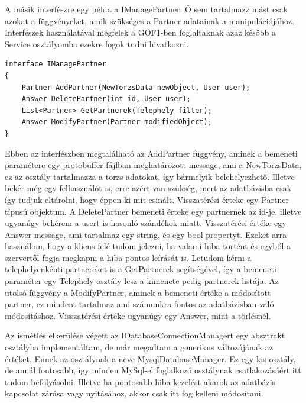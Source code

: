\documentclass[
]{thesis-ekf}
\theoremstyle{definition}
\theoremstyle{remark}
\begin{document}
A másik interfészre egy példa a IManagePartner. Ő sem tartalmazz mást csak azokat a függvényeket, amik szükséges a Partner adatainak a manipulációjához. Interfészek használatával megfelek a GOF1-ben foglaltaknak azaz később a Service osztályomba ezekre fogok tudni hivatkozni.\\
\begin{lstlisting}[caption={Kötelező interfész partnereket kezelő osztályok.},captionpos=b]
interface IManagePartner
{
	Partner AddPartner(NewTorzsData newObject, User user);
	Answer DeletePartner(int id, User user);
	List<Partner> GetPartnerek(Telephely filter);
	Answer ModifyPartner(Partner modifiedObject);
}
\end{lstlisting}
Ebben az interfészben megtalálható az AddPartner függvény, aminek a bemeneti paramétere egy protobuffer fájlban meghatározott message, ami a NewTorzsData, ez az osztály tartalmazza a törzs adatokat, így bármelyik belehelyezhető. Illetve bekér még egy felhasználót is, erre azért van szükség, mert az adatbázisba csak így tudjuk eltárolni, hogy éppen ki mit csinált. Visszatérési érteke egy Partner típusú objektum. A DeletePartner bemeneti érteke egy partnernek az id-je, illetve ugyanúgy bekérem a usert is hasonló szándékok miatt. Visszatérési értéke egy Answer message, ami tartalmaz egy string, és egy bool propertyt. Ezeket arra használom, hogy a kliens felé tudom jelezni, ha valami hiba történt és egyből a szervertől fogja megkapni a hiba pontos leírását is. \cite{errorhandling}Letudom kérni a telephelyenkénti partnereket is a GetPartnerek segítségével, így a bemeneti paraméter egy Telephely osztály lesz a kimenete pedig partnerek listája. Az utolsó függvény a ModifyPartner, aminek a bemeneti értéke a módosított partner, ez mindent tartalmaz ami számunkra fontos az adatbázisban való módosításhoz. Visszatérési értéke ugyanúgy egy Answer, mint a törlésnél.

Az ismétlés elkerülése végett az IDatabaseConnectionManagert egy absztrakt osztályba implementáltam, de már megadtam a generikus változójának az értéket. Ennek az osztálynak a neve MysqlDatabaseManager. Ez egy kis osztály, de annál fontosabb, így minden MySql-el foglalkozó osztálynak csatlakozásáért itt tudom befolyásolni. Illetve ha pontosabb hiba kezelést akarok az adatbázis kapcsolat zárása vagy nyitásához, akkor csak itt fog kelleni módosítani.
\end{document}
